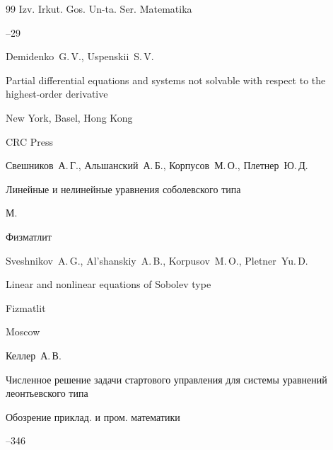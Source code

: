 \begin{thebibliography}{99}
\jour Izv. Irkut. Gos. Un-ta. Ser. Matematika




--29






\by Demidenko~G.\,V., Uspenskii~S.\,V.

\book Partial differential equations and systems not solvable with respect to the highest-order derivative

\publaddr New York, Basel, Hong Kong

\publ CRC Press






\by Свешников~А.\,Г., Альшанский~А.\,Б., Корпусов~М.\,О., Плетнер~Ю.\,Д.

\book Линейные и нелинейные уравнения соболевского типа

\publaddr М.

\publ Физматлит



\misctransl

\by Sveshnikov~A.\,G.,  Al'shanskiy~A.\,B.,  Korpusov~M.\,O.,  Pletner~Yu.\,D.

\book Linear and nonlinear equations of Sobolev type

\publ Fizmatlit

\publaddr Moscow






\by Келлер~А.\,В.

\paper Численное решение задачи стартового управления для системы уравнений леонтьевского типа

\jour Обозрение приклад. и пром. математики




--346

\misctransl 


\end{thebibliography}
